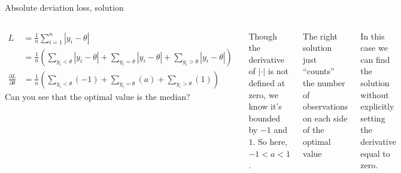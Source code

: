 \documentclass[aspectratio=169]{beamer}
\begin{document}
\begin{frame}{Absolute deviation loss, solution}

\begin{columns}
\begin{align*}
L &= \frac{1}{n} \sum_{i = 1}^{n}|y_i - \theta|\\
&= \frac{1}{n} \left( \sum_{y_i < \theta}|y_i - \theta| + \sum_{y_i = \theta}|y_i - \theta| + \sum_{y_i > \theta}|y_i - \theta| \right)\\
\frac{\partial L}{\partial \theta} &= \frac{1}{n} \left( \sum_{y_i < \theta}(-1) + \sum_{y_i = \theta}(a) + \sum_{y_i > \theta}(1) \right)
\end{align*}
\pause
Can you see that the optimal value is the median?  

\vspace{5mm} Though the derivative of $|\cdot|$ is not defined at zero, we know it's bounded by $-1$ and $1$.  So here, $-1<a<1$.

\vspace{5mm}

\pause

The right solution just ``counts'' the number of observations on each side of the optimal value

\vspace{5mm}

In this case we can find the solution without explicitly setting the derivative equal to zero.  
\end{columns}

\end{frame}
\end{document}
